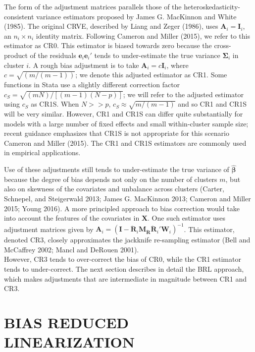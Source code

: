 \documentclass[12pt]{article}
\begin{document}
The form of the adjustment matrices parallels those of the
heteroskedasticity-consistent variance estimators proposed by James G.
MacKinnon and White (1985). The original CRVE, described by Liang and
Zeger (1986), uses \(\mathbf{A}_i = \mathbf{I}_i\), an
\(n_i \times n_i\) identity matrix. Following Cameron and Miller (2015),
we refer to this estimator as CR0. This estimator is biased towards zero
because the cross-product of the residuals
\(\mathbf{e}_i \mathbf{e}_i'\) tends to under-estimate the true variance
\(\boldsymbol\Sigma_i\) in cluster \(i\). A rough bias adjustment is to
take \(\mathbf{A}_i = c\mathbf{I}_i\), where \(c = \sqrt{(m/(m-1))}\);
we denote this adjusted estimator as CR1. Some functions in Stata use a
slightly different correction factor
\(c_S = \sqrt{(m N)/[(m - 1)(N - p)]}\); we will refer to the adjusted
estimator using \(c_S\) as CR1S. When \(N >> p\),
\(c_S \approx \sqrt{m/(m-1)}\) and so CR1 and CR1S will be very similar.
However, CR1 and CR1S can differ quite substantially for models with a
large number of fixed effects and small within-cluster sample size;
recent guidance emphasizes that CR1S is not appropriate for this
scenario Cameron and Miller (2015). The CR1 and CR1S estimators are
commonly used in empirical applications.

Use of these adjustments still tends to under-estimate the true variance
of \(\hat{\boldsymbol\beta}\) because the degree of bias depends not
only on the number of clusters \(m\), but also on skewness of the
covariates and unbalance across clusters (Carter, Schnepel, and
Steigerwald 2013; James G. MacKinnon 2013; Cameron and Miller 2015;
Young 2016). A more principled approach to bias correction would take
into account the features of the covariates in \(\mathbf{X}\). One such
estimator uses adjustment matrices given by
\(\mathbf{A}_i = \left(\mathbf{I} - \mathbf{\ddot{R}}_i \mathbf{M_{\ddot{R}}}\mathbf{\ddot{R}}_i'\mathbf{W}_i\right)^{-1}\).
This estimator, denoted CR3, closely approximates the jackknife
re-sampling estimator (Bell and McCaffrey 2002; Mancl and DeRouen
2001).\\
However, CR3 tends to over-correct the bias of CR0, while the CR1
estimator tends to under-correct. The next section describes in detail
the BRL approach, which makes adjustments that are intermediate in
magnitude between CR1 and CR3.

\hypertarget{sec:BRL}{%
\section{BIAS REDUCED LINEARIZATION}\label{sec:BRL}}
\end{document}
